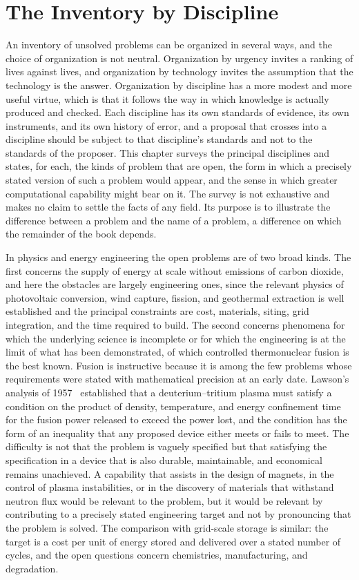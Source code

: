 \chapter{The Inventory by Discipline}
\label{ch:04}

An inventory of unsolved problems can be organized in several ways, and the choice of organization is not neutral. Organization by urgency invites a ranking of lives against lives, and organization by technology invites the assumption that the technology is the answer. Organization by discipline has a more modest and more useful virtue, which is that it follows the way in which knowledge is actually produced and checked. Each discipline has its own standards of evidence, its own instruments, and its own history of error, and a proposal that crosses into a discipline should be subject to that discipline's standards and not to the standards of the proposer. This chapter surveys the principal disciplines and states, for each, the kinds of problem that are open, the form in which a precisely stated version of such a problem would appear, and the sense in which greater computational capability might bear on it. The survey is not exhaustive and makes no claim to settle the facts of any field. Its purpose is to illustrate the difference between a problem and the name of a problem, a difference on which the remainder of the book depends.

In physics and energy engineering the open problems are of two broad kinds. The first concerns the supply of energy at scale without emissions of carbon dioxide, and here the obstacles are largely engineering ones, since the relevant physics of photovoltaic conversion, wind capture, fission, and geothermal extraction is well established and the principal constraints are cost, materials, siting, grid integration, and the time required to build. The second concerns phenomena for which the underlying science is incomplete or for which the engineering is at the limit of what has been demonstrated, of which controlled thermonuclear fusion is the best known. Fusion is instructive because it is among the few problems whose requirements were stated with mathematical precision at an early date. Lawson's analysis of 1957~\cite{lawson1957} established that a deuterium--tritium plasma must satisfy a condition on the product of density, temperature, and energy confinement time for the fusion power released to exceed the power lost, and the condition has the form of an inequality that any proposed device either meets or fails to meet. The difficulty is not that the problem is vaguely specified but that satisfying the specification in a device that is also durable, maintainable, and economical remains unachieved. A capability that assists in the design of magnets, in the control of plasma instabilities, or in the discovery of materials that withstand neutron flux would be relevant to the problem, but it would be relevant by contributing to a precisely stated engineering target and not by pronouncing that the problem is solved. The comparison with grid-scale storage is similar: the target is a cost per unit of energy stored and delivered over a stated number of cycles, and the open questions concern chemistries, manufacturing, and degradation.


